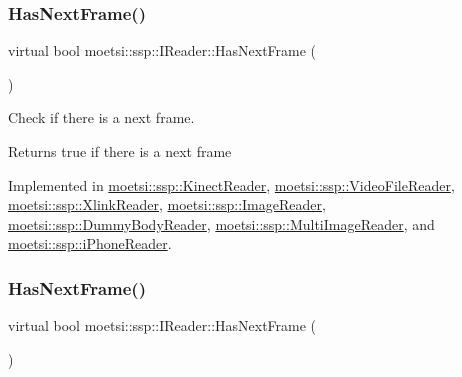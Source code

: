 \subsubsection{\texorpdfstring{Has\+Next\+Frame()}{HasNextFrame()}\hspace{0.1cm}{\footnotesize\ttfamily [1/2]}}
{\footnotesize\ttfamily virtual bool moetsi\+::ssp\+::\+I\+Reader\+::\+Has\+Next\+Frame (\begin{DoxyParamCaption}{ }\end{DoxyParamCaption})\hspace{0.3cm}{\ttfamily [pure virtual]}}



Check if there is a next frame. 

\begin{DoxyReturn}{Returns}
true if there is a next frame 
\end{DoxyReturn}


Implemented in \hyperlink{classmoetsi_1_1ssp_1_1KinectReader_a08934b6eff437142e482bb21780ca171}{moetsi\+::ssp\+::\+Kinect\+Reader}, \hyperlink{classmoetsi_1_1ssp_1_1VideoFileReader_ab5733b56b6d6dd7596eac9d914481c7e}{moetsi\+::ssp\+::\+Video\+File\+Reader}, \hyperlink{classmoetsi_1_1ssp_1_1XlinkReader_ab57ff571372fbbe18f4f5f96e4bc7c21}{moetsi\+::ssp\+::\+Xlink\+Reader}, \hyperlink{classmoetsi_1_1ssp_1_1ImageReader_ad8e87720ca0ec97de501f1070119b28d}{moetsi\+::ssp\+::\+Image\+Reader}, \hyperlink{classmoetsi_1_1ssp_1_1DummyBodyReader_ab91b3c2ccdba21bae040340c34361595}{moetsi\+::ssp\+::\+Dummy\+Body\+Reader}, \hyperlink{classmoetsi_1_1ssp_1_1MultiImageReader_a04240c98d28d8949fca4ecdcb04f04f5}{moetsi\+::ssp\+::\+Multi\+Image\+Reader}, and \hyperlink{classmoetsi_1_1ssp_1_1iPhoneReader_a35ca55a03a9fb7b559f9381b11f53bfe}{moetsi\+::ssp\+::i\+Phone\+Reader}.

\mbox{\label{classmoetsi_1_1ssp_1_1IReader_af9186ba41e136dc4ec3242b5dd55fa04}} 
\subsubsection{\texorpdfstring{Has\+Next\+Frame()}{HasNextFrame()}\hspace{0.1cm}{\footnotesize\ttfamily [2/2]}}
{\footnotesize\ttfamily virtual bool moetsi\+::ssp\+::\+I\+Reader\+::\+Has\+Next\+Frame (\begin{DoxyParamCaption}{ }\end{DoxyParamCaption})\hspace{0.3cm}{\ttfamily [pure virtual]}}



